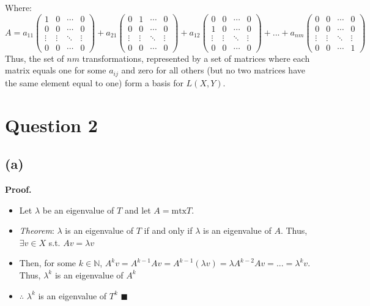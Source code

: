 \documentclass{article}
\newcommand{\N}{\mathbb{N}}
\begin{document}
Where:
\[
	A = a_{11}\begin{pmatrix}	1		& 0			& \cdots & 0 		\\ 
								0 		& 0 		& \cdots & 0 		\\ 
								\vdots 	& \vdots 	& \ddots & \vdots 	\\
								0		& 0			& \cdots & 0 		\end{pmatrix}
	+	a_{21}\begin{pmatrix}	0		& 1			& \cdots & 0 		\\ 
								0 		& 0 		& \cdots & 0 		\\ 
								\vdots 	& \vdots 	& \ddots & \vdots 	\\
								0		& 0			& \cdots & 0 		\end{pmatrix}
	+	a_{12}\begin{pmatrix}	0		& 0			& \cdots & 0 		\\ 
								1 		& 0 		& \cdots & 0 		\\ 
								\vdots 	& \vdots 	& \ddots & \vdots 	\\
								0		& 0			& \cdots & 0 		\end{pmatrix}
	+	...
	+	a_{nm}\begin{pmatrix}	0		& 0			& \cdots & 0 		\\ 
								0 		& 0 		& \cdots & 0 		\\ 
								\vdots 	& \vdots 	& \ddots & \vdots 	\\
								0		& 0			& \cdots & 1 		\end{pmatrix}
\]
Thus, the set of $nm$ transformations, represented by a set of matrices where each matrix equals one for some $a_{ij}$ and zero for all others (but no two matrices have the same element equal to one) form a basis for $L(X,Y)$.


\section*{Question 2}
\subsection*{(a)}
\textbf{Proof.}
\begin{itemize}
	\item Let $\lambda$ be an eigenvalue of $T$ and let $A=\text{mtx}T$.
	\item \textit{Theorem}: $\lambda$ is an eigenvalue of $T$ if and only if $\lambda$ is an eigenvalue of $A$. Thus, $\exists v\in X$ s.t. $Av=\lambda v$
	\item Then, for some $k\in\N$, $A^k v=A^{k-1}A v=A^{k-1}(\lambda v)=\lambda A^{k-2}A v=...=\lambda^k v$. Thus, $\lambda^k$ is an eigenvalue of $A^k$
	\item $\therefore$ $\lambda^k$ is an eigenvalue of $T^k$ $\blacksquare$
\end{itemize}
\end{document}
